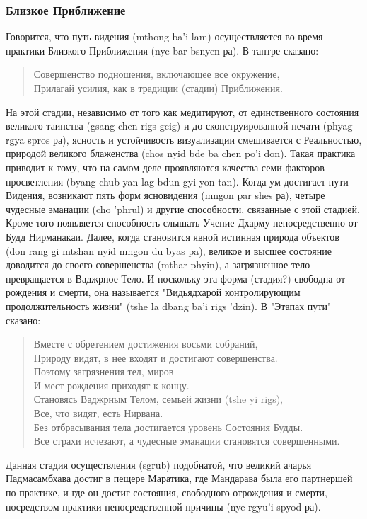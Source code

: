 \subsubsection{Близкое Приближение}
Говорится, что путь видения (mthong ba'i lam) осуществляется во время практики
Близкого Приближения (nye bar bsnyen ра). В тантре сказано:
\begin{verse}
Совершенство подношения, включающее все окружение,\\
Прилагай усилия, как в традиции (стадии) Приближения.
\end{verse}
На этой стадии, независимо от того как медитируют, от единственного состояния
великого таинства (gsang chen rigs gcig) и до сконструированной печати (phyag rgya spros
ра), ясность и устойчивость визуализации смешивается с Реальностью, природой великого
блаженства (chos nyid bde ba chen po'i don). Такая практика приводит к тому, что на самом
деле проявляются качества семи факторов просветления (byang chub yan lag bdun gyi yon tan).
Когда ум достигает пути Видения, возникают пять форм ясновидения (mngon par shes ра),
четыре чудесные эманации (cho 'phrul) и другие способности, связанные с этой стадией.
Кроме того появляется способность слышать Учение-Дхарму непосредственно от Будд
Нирманакаи. Далее, когда становится явной истинная природа объектов (don rang gi mtshan
nyid mngon du byas pa), великое и высшее состояние доводится до своего совершенства
(mthar phyin), а загрязненное тело превращается в Ваджрное Тело. И поскольку эта форма
(стадия?) свободна от рождения и смерти, она называется "Видьядхарой контролирующим
продолжительность жизни" (tshe la dbang ba'i rigs 'dzin). В "Этапах пути" сказано:
\begin{verse}
Вместе с обретением достижения восьми собраний,\\
Природу видят, в нее входят и достигают совершенства.\\
Поэтому загрязнения тел, миров\\
И мест рождения приходят к концу.\\
Становясь Ваджрным Телом, семьей жизни (tshe yi rigs),\\
Все, что видят, есть Нирвана.\\
Без отбрасывания тела достигается уровень Состояния Будды.\\
Все страхи исчезают, а чудесные эманации становятся совершенными.
\end{verse}
Данная стадия осуществления (sgrub) подобнатой, что великий ачарья
Падмасамбхава достиг в пещере Маратика, где Мандарава была его партнершей по практике,
и где он достиг состояния, свободного отрождения и смерти, посредством практики
непосредственной причины (nye rgyu'i spyod ра).
